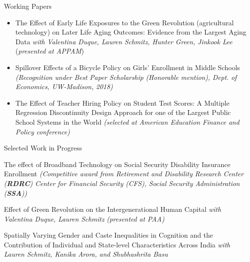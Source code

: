 \documentclass{resume} %
\begin{document}
\begin{rSection}{Working Papers}
\begin{itemize}
\item The Effect of Early Life Exposures to the Green Revolution (agricultural technology) on Later Life Aging Outcomes: Evidence from the Largest Aging Data \textit{with Valentina Duque, Lauren Schmitz, Hunter Green, Jinkook Lee} (\textit{\scriptsize{presented at APPAM}}) 

\item Spillover Effects of a Bicycle Policy on Girls' Enrollment in Middle Schools \textit{\scriptsize{(Recognition under Best Paper Scholarship (Honorable mention), Dept. of Economics, UW-Madison, 2018) }}

\item The Effect of Teacher Hiring Policy on Student Test Scores: A Multiple Regression Discontinuity Design Approach for one of the Largest Public School Systems in the World \textit{\scriptsize{(selected at American Education Finance and Policy conference)}}

\end{itemize}








\end{rSection}


\begin{rSection}{Selected Work in Progress}


\item The effect of Broadband Technology on Social Security Disability Insurance Enrollment \textit{\scriptsize{(Competitive award from Retirement and Disability Research Center (\textbf{RDRC}) Center for Financial Security (CFS), Social Security Administration (\textbf{SSA}))}}

\item Effect of Green Revolution on the Intergenerational Human Capital \textit{with Valentina Duque, Lauren Schmitz} \textit{\scriptsize{(presented at PAA})}

\item Spatially Varying Gender and Caste Inequalities in Cognition and the Contribution of Individual and State-level Characteristics Across India \textit{with Lauren Schmitz, Kanika Arora, and Shubhashrita Basu}


\end{rSection}
\end{document}
